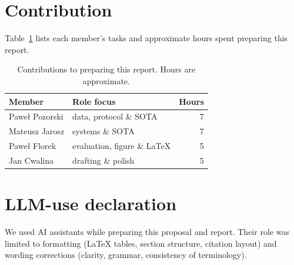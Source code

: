 \documentclass[11pt]{article}
\begin{document}
\section{Contribution}
\label{sec:contrib}
Table~\ref{tab:contrib} lists each member's tasks and approximate hours spent preparing this report.

\begin{table}[t]
\centering
\caption{Contributions to preparing this report. Hours are approximate.}
\label{tab:contrib}
\small
\setlength{\tabcolsep}{4pt}
\begin{tabular}{@{}lp{4.4cm}r@{}}
\toprule
Member & Role focus & Hours \\
\midrule
Pawe{\l} Pozorski & data, protocol \& SOTA & 7 \\
Mateusz Jarosz & systems \& SOTA & 7 \\
Pawe{\l} Florek & evaluation, figure \& LaTeX & 5 \\
Jan Cwalina & drafting \& polish & 5 \\
\bottomrule
\end{tabular}
\end{table}

\section{LLM-use declaration}
\label{sec:llm}
We used AI assistants while preparing this proposal and report.
Their role was limited to formatting (LaTeX tables, section structure, citation layout) and wording corrections (clarity, grammar, consistency of terminology).



\end{document}
